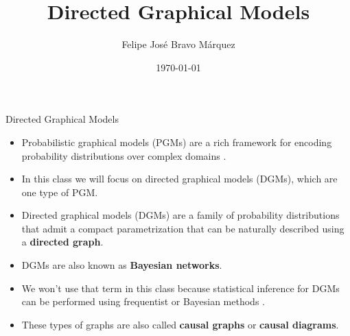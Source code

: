 \documentclass[handout]{beamer}
\title{Directed Graphical Models}
\author[Felipe Bravo Márquez]{\footnotesize
 \textcolor[rgb]{0.00,0.00,1.00}{Felipe José Bravo Márquez}}
\date{ \today }
\begin{document}
\begin{frame}
\titlepage


\end{frame}




\begin{frame}{Directed Graphical Models}
\scriptsize{
\begin{itemize}
\item Probabilistic graphical models (PGMs) are a rich framework for encoding probability distributions over complex domains  \cite{koller2009probabilistic}.

\item In this class we will focus on directed graphical models (DGMs), which are one type of PGM.

\item Directed graphical models (DGMs) are a family of probability distributions that admit a compact parametrization that can be naturally described using a \textbf{directed graph}.

\item DGMs are also known as \textbf{Bayesian networks}.

\item We won't use that term in this class because statistical inference for DGMs can be performed using frequentist or Bayesian methods \cite{wasserman2013all}.

\item These types of graphs are also called \textbf{causal graphs} or \textbf{causal diagrams}.

 
\end{itemize}



} 

\end{frame}
\end{document}
